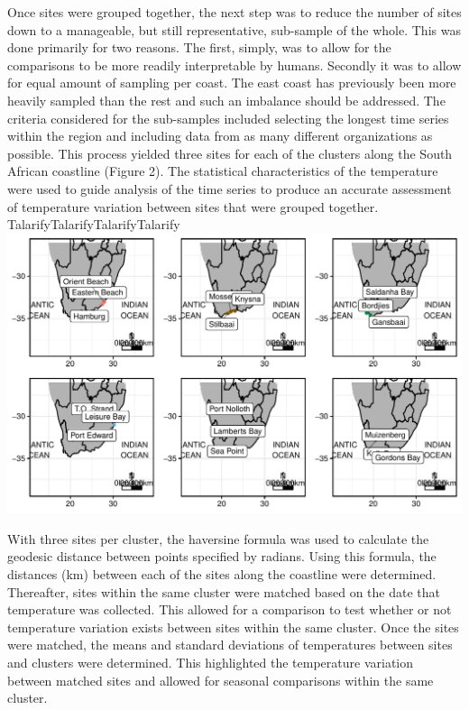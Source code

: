 \documentclass[12pt,]{article}
\begin{document}
Once sites were grouped together, the next step was to reduce the number
of sites down to a manageable, but still representative, sub-sample of
the whole. This was done primarily for two reasons. The first, simply,
was to allow for the comparisons to be more readily interpretable by
humans. Secondly it was to allow for equal amount of sampling per coast.
The east coast has previously been more heavily sampled than the rest
and such an imbalance should be addressed. The criteria considered for
the sub-samples included selecting the longest time series within the
region and including data from as many different organizations as
possible. This process yielded three sites for each of the clusters
along the South African coastline (Figure 2). The statistical
characteristics of the temperature were used to guide analysis of the
time series to produce an accurate assessment of temperature variation
between sites that were grouped together.
TalarifyTalarifyTalarifyTalarify
\includegraphics{figures/final_combined_plot.pdf}

With three sites per cluster, the haversine formula was used to
calculate the geodesic distance between points specified by radians.
Using this formula, the distances (km) between each of the sites along
the coastline were determined. Thereafter, sites within the same cluster
were matched based on the date that temperature was collected. This
allowed for a comparison to test whether or not temperature variation
exists between sites within the same cluster. Once the sites were
matched, the means and standard deviations of temperatures between sites
and clusters were determined. This highlighted the temperature variation
between matched sites and allowed for seasonal comparisons within the
same cluster.
\end{document}

